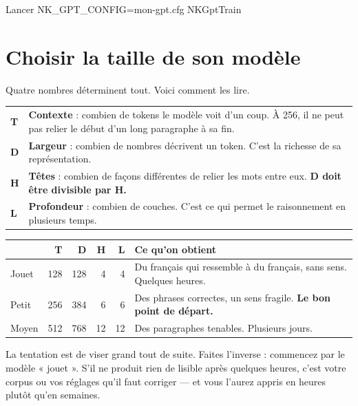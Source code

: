 \begin{nkcode}[]{Lancer}
NK_GPT_CONFIG=mon-gpt.cfg NKGptTrain
\end{nkcode}

\section{Choisir la taille de son modèle}

Quatre nombres déterminent tout. Voici comment les lire.

\begin{center}
\begin{tabular}{lp{10.2cm}}
\toprule
\textbf{T} & \textbf{Contexte} : combien de tokens le modèle voit d'un coup. À
             256, il ne peut pas relier le début d'un long paragraphe à sa fin. \\
\textbf{D} & \textbf{Largeur} : combien de nombres décrivent un token. C'est la
             richesse de sa représentation. \\
\textbf{H} & \textbf{Têtes} : combien de façons différentes de relier les mots
             entre eux. \textbf{D doit être divisible par H.} \\
\textbf{L} & \textbf{Profondeur} : combien de couches. C'est ce qui permet le
             raisonnement en plusieurs temps. \\
\bottomrule
\end{tabular}
\end{center}

\begin{center}
\begin{tabular}{lrrrrp{4.4cm}}
\toprule
 & \textbf{T} & \textbf{D} & \textbf{H} & \textbf{L} & \textbf{Ce qu'on obtient} \\
\midrule
Jouet & 128 & 128 & 4 & 4 & Du français qui ressemble à du français, sans
                            sens. Quelques heures. \\
Petit & 256 & 384 & 6 & 6 & Des phrases correctes, un sens fragile.
                            \textbf{Le bon point de départ.} \\
Moyen & 512 & 768 & 12 & 12 & Des paragraphes tenables. Plusieurs jours. \\
\bottomrule
\end{tabular}
\end{center}

\begin{nkpiege}
La tentation est de viser grand tout de suite. Faites l'inverse : commencez par
le modèle « jouet ». S'il ne produit rien de lisible après quelques heures,
c'est votre corpus ou vos réglages qu'il faut corriger — et vous l'aurez appris
en heures plutôt qu'en semaines.
\end{nkpiege}


